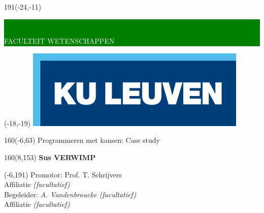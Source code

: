\documentclass[12pt,a4paper,oneside]{book}
\begin{document}
\thispagestyle{empty}
\newcommand{\form}[1]{\scalebox{1.087}{\boldmath{#1}}}
\sffamily
%
\begin{textblock}{191}(-24,-11)
\colorbox{green}{\hspace{123mm}\ \parbox[c][18truemm]{68mm}{\textcolor{white}{FACULTEIT WETENSCHAPPEN}}}
\end{textblock}
%
\begin{textblock}{70}(-18,-19)
\textblockcolour{}
\includegraphics*[height=19.8truemm]{LogoKULeuven}
\end{textblock}
%
\begin{textblock}{160}(-6,63)
\textblockcolour{}
\vspace{-\parskip}
\flushleft
\fontsize{40}{42}\selectfont \textcolor{bluetitle}{Programmeren met kansen: Case study}\\[1.5mm]
\end{textblock}
%
\begin{textblock}{160}(8,153)
\textblockcolour{}
\vspace{-\parskip}
\flushright
\fontsize{14}{16}\selectfont \textbf{Sus VERWIMP}
\end{textblock}
%
\begin{textblock}{70}(-6,191)
\textblockcolour{}
\vspace{-\parskip}
\flushleft
Promotor: Prof. T. Schrijvers\\[-2pt]
\textcolor{blueaff}{Affiliatie \textsl{(facultatief)}}\\[5pt]
Begeleider: \textsl{A. Vandenbroucke (facultatief)}\\[-2pt]
\textcolor{blueaff}{Affiliatie \textsl{(facultatief)}}\\
\end{textblock}
\end{document}
